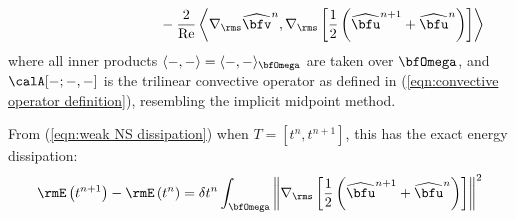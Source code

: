 \begin{example}
\begin{align*}
            &                                                    &                                                                                                                  &\;\;\;\;\;\;\;\;\;\;\;\;\;\;\;\;\;\;\;\;\;\;\;\;\;\;\;\;\;\;\;\;  - \frac{2}{\rmRe}\left\langle\nabla_{\rms}\widehat{\bfv}^{n}, \nabla_{\rms}\left[\frac{1}{2}\left(\widehat{\bfu}^{n + 1} + \widehat{\bfu}^{n}\right)\right]\right\rangle
        \end{align*}
        where all inner products $\langle -, -\rangle  =  \langle -, -\rangle_{\bfOmega}$ are taken over $\bfOmega$, and $\calA[-; -, -]$ is the trilinear convective operator as defined in (\ref{eqn:convective operator definition}), resembling the implicit midpoint method.

        From (\ref{eqn:weak NS dissipation}) when $T  =  [t^{n}, t^{n + 1}]$, this has the exact energy dissipation:
        \begin{equation}
            \rmE\left(t^{n + 1}\right)  -  \rmE\left(t^{n}\right)  =  \delta t^{n}\int_{\bfOmega}\left\|\nabla_{\rms}\left[\frac{1}{2}\left(\widehat{\bfu}^{n + 1} + \widehat{\bfu}^{n}\right)\right]\right\|^{2}
        \end{equation}

    \end{example}
